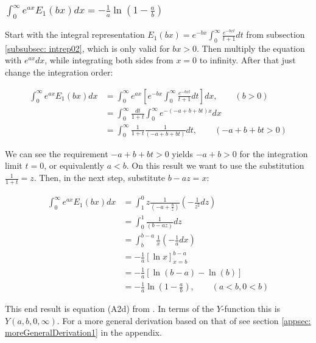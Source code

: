 \documentclass[bibliography=totocnumbered]{scrartcl}
\newcommand{\assume}[1][\text{MISSING PARAMETER}]{,\qquad\left(#1\right)}
\begin{document}
	\subsubsection[A integral of E1, involving the exponential function]{$\int_{0}^{\infty}e^{ax}E_1\left(bx\right)dx=-\frac{1}{a}\ln\left(1-\frac{a}{b}\right)$}
	\label{subsubsec: generalIntegralOfE3}
	
	Start with the integral representation $E_1\left(bx\right)=e^{-bx}\int_{0}^{\infty}\frac{e^{-bxt}}{t+1}dt$ from subsection \ref{subsubsec: intrep02}, which is only valid for $bx>0$. Then multiply the equation with $e^{ax}dx$, while integrating both sides from $x=0$ to infinity. After that just change the integration order:
	
	\begin{align}
		\int_{0}^{\infty}e^{ax}E_1\left(bx\right)dx&=\int_{0}^{\infty}e^{ax}\left[e^{-bx}\int_{0}^{\infty}\frac{e^{-bxt}}{t+1}dt\right]dx\assume[b>0]\\
		&=\int_{0}^{\infty}\frac{dt}{1+t}\int_{0}^{\infty}e^{-\left(-a+b+bt\right)x}dx\\
		&=\int_{0}^{\infty}\frac{1}{1+t}\frac{1}{\left(-a+b+bt\right)}dt\assume[-a+b+bt>0]
	\end{align}
	
	We can see the requirement $-a+b+bt>0$ yields $-a+b>0$ for the integration limit $t=0$, or equivalently $a<b$. On this result we want to use the substitution $\frac{1}{1+t}=z$. Then, in the next step, substitute $b-az=x$:
	
	\begin{align}
		\int_{0}^{\infty}e^{ax}E_1\left(bx\right)dx&=\int_{1}^{0}z\frac{1}{\left(-a+\frac{b}{z}\right)}\left(-\frac{1}{z^2}dz\right)\\
		&=\int_{0}^{1}\frac{1}{\left(b-az\right)}dz\\
		&=\int_{b}^{b-a}\frac{1}{x}\left(-\frac{1}{a}dx\right)\\
		&=-\frac{1}{a}\left[\ln{x}\right]^{b-a}_{x=b}\\
		&=-\frac{1}{a}\left[\ln{\left(b-a\right)}-\ln{\left(b\right)}\right]\\
		&=-\frac{1}{a}\ln{\left(1-\frac{a}{b}\right)}\assume[a<b, 0<b]\label{eq: generalIntegralOfE3}
	\end{align}
	
	This end result is equation (A2d) from \cite{boer1990calc}. In terms of the $Y$-function this is $Y\left(a,b,0,\infty\right)$. For a more general derivation based on that of \autocite[73\psq]{schloemilch} see section \ref{appsec: moreGeneralDerivation1} in the appendix.
	
\end{document}
